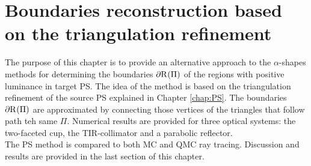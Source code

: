 \chapter{Boundaries reconstruction based on the triangulation refinement}\label{chap:triangulation}
The purpose of this chapter is to provide an alternative approach to the $\alpha$-shapes methods for determining the boundaries $\partial \mbox{$\textup{R}_{\textit{}}$}(\Pi)$ of the regions with positive luminance in target PS. The idea of the method is based on the triangulation refinement of the source PS explained in Chapter \ref{chap:PS}. The boundaries $\partial \mbox{$\textup{R}_{\textit{}}$}(\Pi)$ are approximated by connecting those vertices of the triangles that follow path teh same $\Pi$. Numerical results are provided for three optical systems: the two-faceted cup, the TIR-collimator and a parabolic reflector.\\ \indent The PS method is compared to both MC and QMC ray tracing. Discussion and results are provided in the last section of this chapter.
